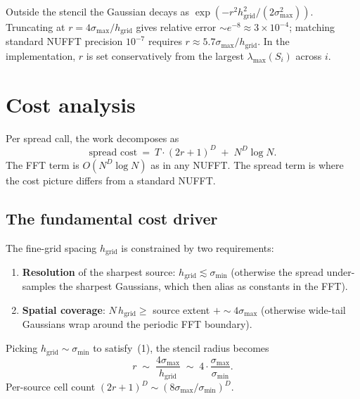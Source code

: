 \documentclass[11pt]{article}
\begin{document}
Outside the stencil the Gaussian decays as
$\exp(-r^2 h_{\text{grid}}^2 / (2 \sigma_{\max}^2))$.  Truncating at
$r = 4\sigma_{\max}/h_{\text{grid}}$ gives relative error $\sim
e^{-8} \approx 3\times 10^{-4}$; matching standard NUFFT precision
$10^{-7}$ requires $r \approx 5.7\sigma_{\max}/h_{\text{grid}}$.  In
the implementation, $r$ is set conservatively from the largest
$\lambda_{\max}(S_i)$ across $i$.

\section{Cost analysis}
\label{sec:cost}

Per spread call, the work decomposes as
\begin{equation}
\boxed{\;
\text{spread cost}\ =\ T \cdot (2r+1)^D
\;+\;
N^D \log N.
\;}
\end{equation}
The FFT term is $O(N^D \log N)$ as in any NUFFT.  The spread term is
where the cost picture differs from a standard NUFFT.

\subsection{The fundamental cost driver}

The fine-grid spacing $h_{\text{grid}}$ is constrained by two requirements:

\begin{enumerate}
\item \textbf{Resolution} of the sharpest source: $h_{\text{grid}}
\lesssim \sigma_{\min}$ (otherwise the spread under-samples the
sharpest Gaussians, which then alias as constants in the FFT).
\item \textbf{Spatial coverage}: $N\,h_{\text{grid}} \geq$ source
extent $+ \sim 4 \sigma_{\max}$ (otherwise wide-tail Gaussians wrap
around the periodic FFT boundary).
\end{enumerate}

Picking $h_{\text{grid}} \sim \sigma_{\min}$ to satisfy~(1), the
stencil radius becomes
\begin{equation}
r \;\sim\; \frac{4\sigma_{\max}}{h_{\text{grid}}}
\;\sim\; 4 \cdot \frac{\sigma_{\max}}{\sigma_{\min}}.
\end{equation}
Per-source cell count $(2r+1)^D \sim (8\sigma_{\max}/\sigma_{\min})^D$.
\end{document}
